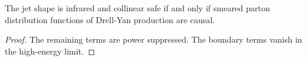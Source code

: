 \begin{lemma}\label{thm:1}
The jet shape is infrared and collinear safe if and only if smeared
parton distribution functions of Drell-Yan production are causal.
\end{lemma}

\begin{proof}
The remaining terms are power suppressed. The boundary terms vanish in
the high-energy limit.
\end{proof}

